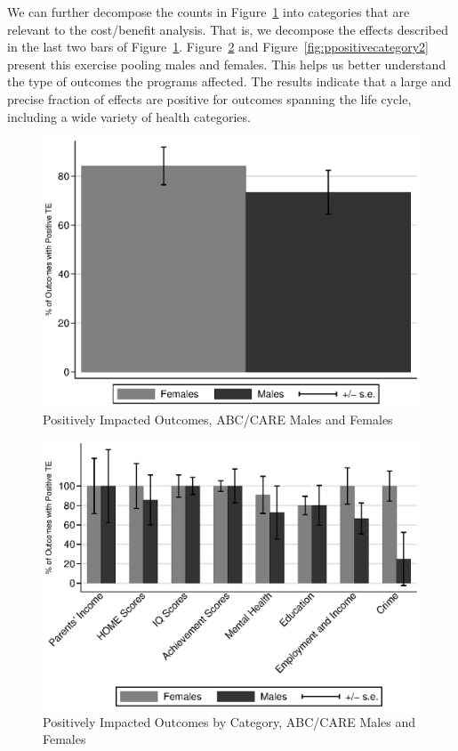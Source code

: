 We can further decompose the counts in Figure~\ref{fig:ppositive} into categories that are relevant to the cost/benefit analysis. That is, we decompose the effects described in the last two bars of Figure~\ref{fig:ppositive}. Figure~\ref{fig:ppositivecategory1} and Figure~\ref{fig:ppositivecategory2} present this exercise pooling males and females. This helps us better understand the type of outcomes the programs affected. The results indicate that a large and precise fraction of effects are positive for outcomes spanning the life cycle, including a wide variety of health categories.

\begin{figure}[H]
		\caption{Positively Impacted Outcomes, ABC/CARE Males and Females} \label{fig:ppositive}
		\includegraphics[width=.7\columnwidth]{output/itt_noctrl_all.eps}
\end{figure}

\begin{figure}[H]
		\caption{Positively Impacted Outcomes by Category, ABC/CARE Males and Females} \label{fig:ppositivecategory1}
		\includegraphics[width=.8\columnwidth]{output/itt_noctrl_cats1.eps}
\end{figure}

